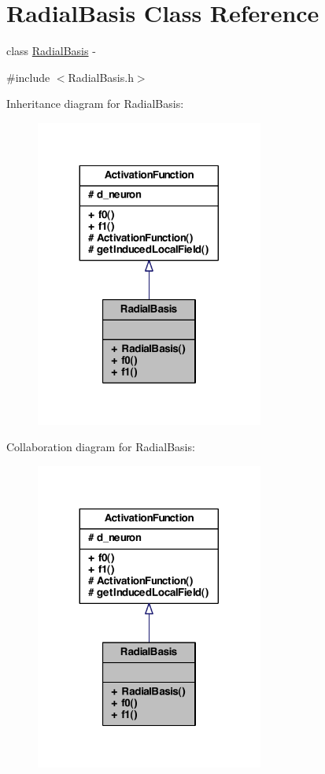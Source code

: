 \hypertarget{class_radial_basis}{
\section{RadialBasis Class Reference}
\label{class_radial_basis}
}


class \hyperlink{class_radial_basis}{RadialBasis} -\/  




{\ttfamily \#include $<$RadialBasis.h$>$}



Inheritance diagram for RadialBasis:\nopagebreak
\begin{figure}[H]
\begin{center}
\leavevmode
\includegraphics[width=212pt]{class_radial_basis__inherit__graph}
\end{center}
\end{figure}


Collaboration diagram for RadialBasis:\nopagebreak
\begin{figure}[H]
\begin{center}
\leavevmode
\includegraphics[width=212pt]{class_radial_basis__coll__graph}
\end{center}
\end{figure}
